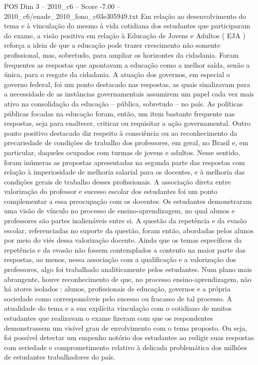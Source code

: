\begin{textsample}{POS Dim 3 – 2010\_c6 – Score -7.00 – 2010\_c6/enade\_2010\_fono\_c03e305949.txt}
Em relação ao desenvolvimento do tema e à vinculação do mesmo à vida cotidiana dos estudantes que participaram do exame, a visão positiva em relação à Educação de Jovens e Adultos ( EJA ) reforça a ideia de que a educação pode trazer crescimento não somente profissional, mas, sobretudo, para ampliar os horizontes da cidadania.
Foram frequentes as respostas que apontavam a educação como a melhor saída, senão a única, para o resgate da cidadania.
A atuação dos governos, em especial o governo federal, foi um ponto destacado nas respostas, as quais sinalizavam para a necessidade de as instâncias governamentais assumirem um papel cada vez mais ativo na consolidação da educação – pública, sobretudo – no país.
As políticas públicas focadas na educação foram, então, um item bastante frequente nas respostas, seja para enaltecer, criticar ou requisitar a ação governamental.
Outro ponto positivo destacado diz respeito à consciência ou ao reconhecimento da precariedade de condições de trabalho dos professores, em geral, no Brasil e, em particular, daqueles ocupados com turmas de jovens e adultos.
Nesse sentido, foram inúmeras as propostas apresentadas na segunda parte das respostas com relação à imperiosidade de melhoria salarial para os docentes, e à melhoria das condições gerais de trabalho desses profissionais.
A associação direta entre valorização do professor e sucesso escolar dos estudantes foi um ponto complementar a essa preocupação com os docentes.
Os estudantes demonstraram uma visão de vínculo no processo de ensino-aprendizagem, no qual alunos e professores são partes inalienáveis entre si.
A questão da repetência e da evasão escolar, referenciadas no suporte da questão, foram então, abordadas pelos alunos por meio do viés dessa valorização docente.
Ainda que os temas específicos da repetência e da evasão não fossem contemplados a contento na maior parte das respostas, ao menos, nessa associação com a qualificação e a valorização dos professores, algo foi trabalhado analiticamente pelos estudantes.
Num plano mais abrangente, houve reconhecimento de que, no processo ensino-aprendizagem, não há atores isolados : alunos, profissionais de educação, governos e a própria sociedade como corresponsáveis pelo sucesso ou fracasso de tal processo.
A atualidade do tema e a sua explícita vinculação com o cotidiano de muitos estudantes que realizavam o exame fizeram com que os respondentes demonstrassem um visível grau de envolvimento com o tema proposto.
Ou seja, foi possível detectar um empenho notório dos estudantes ao redigir suas respostas com seriedade e comprometimento relativo à delicada problemática dos milhões de estudantes trabalhadores do país.

\end{textsample}
